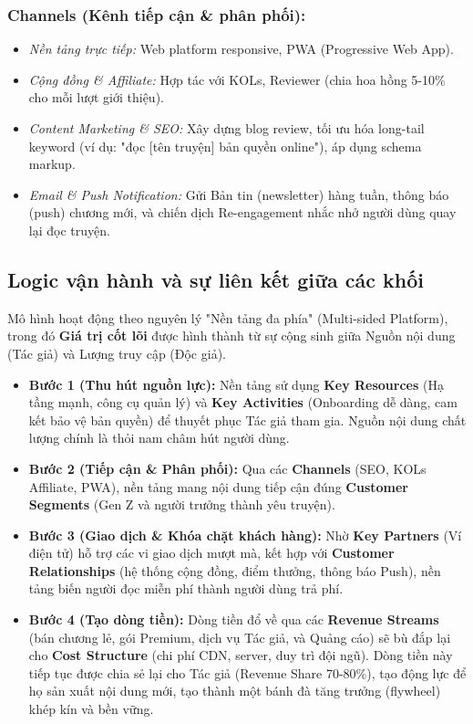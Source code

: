 \subsubsection{Channels (Kênh tiếp cận \& phân phối):}
\begin{itemize}
    \item \textit{Nền tảng trực tiếp:} Web platform responsive, PWA (Progressive Web App).
    \item \textit{Cộng đồng \& Affiliate:} Hợp tác với KOLs, Reviewer (chia hoa hồng 5-10\% cho mỗi lượt giới thiệu).
    \item \textit{Content Marketing \& SEO:} Xây dựng blog review, tối ưu hóa long-tail keyword (ví dụ: "đọc [tên truyện] bản quyền online"), áp dụng schema markup.
    \item \textit{Email \& Push Notification:} Gửi Bản tin (newsletter) hàng tuần, thông báo (push) chương mới, và chiến dịch Re-engagement nhắc nhở người dùng quay lại đọc truyện.
\end{itemize}

\subsection{Logic vận hành và sự liên kết giữa các khối}
Mô hình hoạt động theo nguyên lý "Nền tảng đa phía" (Multi-sided Platform), trong đó \textbf{Giá trị cốt lõi} được hình thành từ sự cộng sinh giữa Nguồn nội dung (Tác giả) và Lượng truy cập (Độc giả).

\begin{itemize}
    \item \textbf{Bước 1 (Thu hút nguồn lực):} Nền tảng sử dụng \textbf{Key Resources} (Hạ tầng mạnh, công cụ quản lý) và \textbf{Key Activities} (Onboarding dễ dàng, cam kết bảo vệ bản quyền) để thuyết phục Tác giả tham gia. Nguồn nội dung chất lượng chính là thỏi nam châm hút người dùng.
    \item \textbf{Bước 2 (Tiếp cận \& Phân phối):} Qua các \textbf{Channels} (SEO, KOLs Affiliate, PWA), nền tảng mang nội dung tiếp cận đúng \textbf{Customer Segments} (Gen Z và người trưởng thành yêu truyện). 
    \item \textbf{Bước 3 (Giao dịch \& Khóa chặt khách hàng):} Nhờ \textbf{Key Partners} (Ví điện tử) hỗ trợ các vi giao dịch mượt mà, kết hợp với \textbf{Customer Relationships} (hệ thống cộng đồng, điểm thưởng, thông báo Push), nền tảng biến người đọc miễn phí thành người dùng trả phí.
    \item \textbf{Bước 4 (Tạo dòng tiền):} Dòng tiền đổ về qua các \textbf{Revenue Streams} (bán chương lẻ, gói Premium, dịch vụ Tác giả, và Quảng cáo) sẽ bù đắp lại cho \textbf{Cost Structure} (chi phí CDN, server, duy trì đội ngũ). Dòng tiền này tiếp tục được chia sẻ lại cho Tác giả (Revenue Share 70-80\%), tạo động lực để họ sản xuất nội dung mới, tạo thành một bánh đà tăng trưởng (flywheel) khép kín và bền vững.
\end{itemize}
